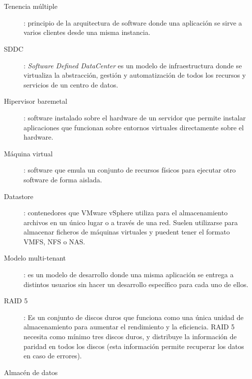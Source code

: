 \chapter*{\nomeglosariotermos}
\label{chap:glosario-termos}


\begin{description}
 \item [Tenencia múltiple]: principio de la arquitectura de software donde una aplicación se sirve a varios clientes desde una misma instancia.
 \label{itm:tenenciamultiple}
 \item [SDDC]: \textit{Software Defined DataCenter} es un modelo de infraestructura donde se virtualiza la abstracción, gestión y automatización de todos los recursos y servicios de un centro de datos.
 \item [Hipervisor baremetal]: software instalado sobre el hardware de un servidor que permite instalar aplicaciones que funcionan sobre entornos virtuales directamente sobre el hardware.
  \label{itm:baremetal}
 \item [Máquina virtual]: software que emula un conjunto de recursos físicos para ejecutar otro software de forma aislada.
  \label{itm:vm}
 \item [Datastore]: contenedores que VMware vSphere utiliza para el almacenamiento archivos en un único lugar o a través de una red. Suelen utilizarse para almacenar ficheros de máquinas virtuales y puedent tener el formato VMFS, NFS o NAS.
 \label{itm:datastore}
 \item [Modelo multi-tenant]: es un modelo de desarrollo donde una misma aplicación se entrega a distintos usuarios sin hacer un desarrollo específico para cada uno de ellos.
 \label{itm:multitenant}
 \item [RAID 5]: Es un conjunto de discos duros que funciona como una única unidad de almacenamiento para aumentar el rendimiento y la eficiencia. RAID 5 necesita como mínimo tres discos duros, y distribuye la información de paridad en todos los discos (esta información permite recuperar los datos en caso de errores).
 \label{itm:raid5}
 \item [Almacén de datos]

\end{description}
